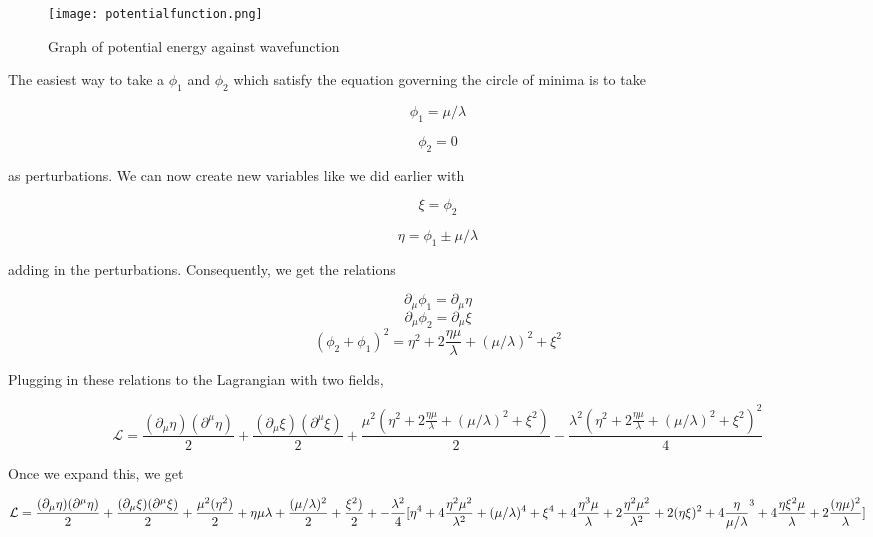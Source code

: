 \documentclass[12pt]{article}
\begin{document}
\begin{figure}[H]
	\begin{center}
		\texttt{[image: potentialfunction.png]}
	\end{center}
	\caption{Graph of potential energy against wavefunction}
	\label{fig:figure2}
	\cite{ts}
\end{figure}

The easiest way to take a $\phi_1$ and $\phi_2$  which satisfy the equation governing the circle of minima	is to take 

\begin{equation}
\phi_1=\mu/\lambda
\end{equation}	
	
\begin{equation}
\phi_2=0
\end{equation}	
	
as perturbations. We can now create new variables like we did earlier with

\begin{equation}
\xi=\phi_2
\end{equation} 	
	
\begin{equation}
\eta=\phi_1\pm\mu/\lambda
\end{equation}

adding in the perturbations. Consequently, we get the relations

\begin{equation}
\partial_\mu\phi_1=\partial_\mu\eta
\end{equation}
\begin{equation}
\partial_\mu\phi_2=\partial_\mu\xi
\end{equation}
\begin{equation}
(\phi_2+\phi_1)^2=\eta^2+2\frac{\eta\mu}{\lambda}+(\mu/\lambda)^2+\xi^2
\end{equation}

Plugging in these relations to the Lagrangian with two fields,

\begin{equation}
\mathcal{L}=\frac{(\partial_\mu\eta)(\partial^\mu\eta)}{2}+\frac{(\partial_\mu\xi)(\partial^\mu\xi)}{2}+\frac{\mu^2(\eta^2+2\frac{\eta\mu}{\lambda}+(\mu/\lambda)^2+\xi^2)}{2}-\frac{\lambda^2(\eta^2+2\frac{\eta\mu}{\lambda}+(\mu/\lambda)^2+\xi^2)^2}{4}
\end{equation}

Once we expand this, we get

\begin{equation}
\mathcal{L}=\frac{(\partial_\mu\eta)(\partial^\mu\eta)}{2}+\frac{(\partial_\mu\xi)(\partial^\mu\xi)}{2}+\frac{\mu^2(\eta^2)}{2}+{\eta\mu}{\lambda}+\frac{(\mu/\lambda)^2}{2}+\frac{\xi^2)}{2}+-\frac{\lambda^2}{4}[{\eta^4
\\+4\frac{\eta^2\mu^2}{\lambda^2}+(\mu/\lambda)^4+\xi^4+4\frac{\eta^3\mu}{\lambda}+2\frac{\eta^2\mu^2}{\lambda^2}+2(\eta\xi)^2+4\frac{\eta}{\mu/\lambda}^3+4\frac{\eta\xi^2\mu}{\lambda}+2\frac{(\eta\mu)^2}{\lambda}}]
\end{equation} 
\end{document}
